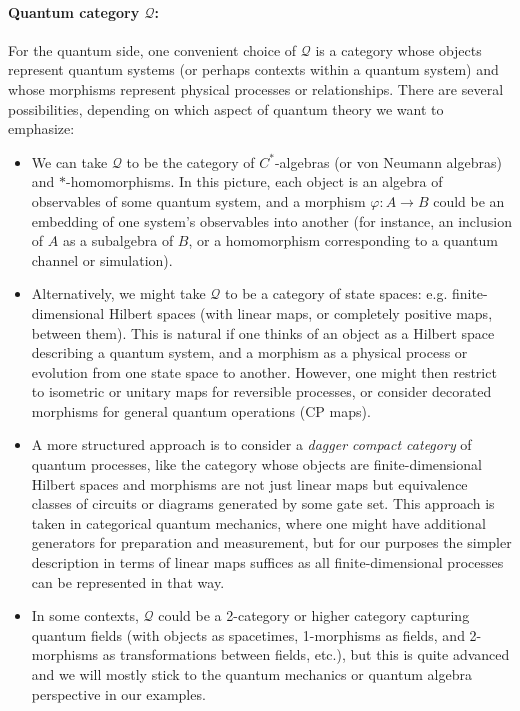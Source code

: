 \paragraph{Quantum category $\mathcal{Q}$:} 
For the quantum side, one convenient choice of $\mathcal{Q}$ is a category whose objects represent quantum systems (or perhaps contexts within a quantum system) and whose morphisms represent physical processes or relationships. There are several possibilities, depending on which aspect of quantum theory we want to emphasize:

\begin{itemize}
    \item We can take $\mathcal{Q}$ to be the category of $C^*$-algebras (or von Neumann algebras) and $*$-homomorphisms. In this picture, each object is an algebra of observables of some quantum system, and a morphism $\varphi: A \to B$ could be an embedding of one system's observables into another (for instance, an inclusion of $A$ as a subalgebra of $B$, or a homomorphism corresponding to a quantum channel or simulation).
    
    \item Alternatively, we might take $\mathcal{Q}$ to be a category of state spaces: e.g. finite-dimensional Hilbert spaces (with linear maps, or completely positive maps, between them). This is natural if one thinks of an object as a Hilbert space describing a quantum system, and a morphism as a physical process or evolution from one state space to another. However, one might then restrict to isometric or unitary maps for reversible processes, or consider decorated morphisms for general quantum operations (CP maps).
    
    \item A more structured approach is to consider a \emph{dagger compact category} of quantum processes, like the category whose objects are finite-dimensional Hilbert spaces and morphisms are not just linear maps but equivalence classes of circuits or diagrams generated by some gate set. This approach is taken in categorical quantum mechanics, where one might have additional generators for preparation and measurement, but for our purposes the simpler description in terms of linear maps suffices as all finite-dimensional processes can be represented in that way.
    
    \item In some contexts, $\mathcal{Q}$ could be a 2-category or higher category capturing quantum fields (with objects as spacetimes, 1-morphisms as fields, and 2-morphisms as transformations between fields, etc.), but this is quite advanced and we will mostly stick to the quantum mechanics or quantum algebra perspective in our examples.
\end{itemize}

